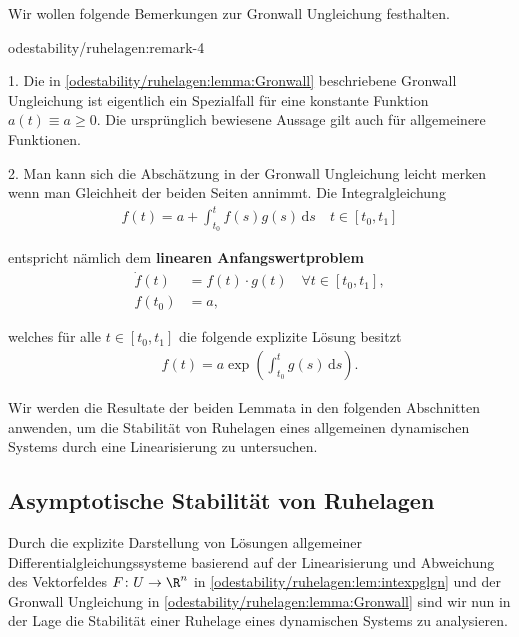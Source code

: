 \documentclass[letterpaper,10pt,english]{jupyterBook}
\begin{document}
\par
Wir wollen folgende Bemerkungen zur Gronwall Ungleichung festhalten.
\begin{remark}{}{odestability/ruhelagen:remark-4}



\par
1. Die in \cref{odestability/ruhelagen:lemma:Gronwall} beschriebene Gronwall Ungleichung ist eigentlich ein Spezialfall für eine konstante Funktion \(a(t) \equiv a \geq 0\).
Die ursprünglich bewiesene Aussage gilt auch für allgemeinere Funktionen.

\par
2. Man kann sich die Abschätzung in der Gronwall Ungleichung leicht merken wenn man Gleichheit der beiden Seiten annimmt.
Die Integralgleichung
\begin{align*}
f(t) = a + \int_{t_0}^t f(s)g(s)\, \mathrm{d}s \quad t\in [t_0,t_1]
\end{align*}
\par
entspricht nämlich dem \textbf{linearen Anfangswertproblem}
\begin{align*}
\dot{f}(t) &= f(t)\cdot g(t) \quad \forall t \in [t_0, t_1], \\
f(t_0) &= a,
\end{align*}
\par
welches für alle \(t \in [t_0, t_1]\) die folgende explizite Lösung besitzt
\begin{align*}
f(t) = a \exp{\left( \int_{t_0}^t g(s)\, \mathrm{d}s \right)}.
\end{align*}\end{remark}

\par
Wir werden die Resultate der beiden Lemmata in den folgenden Abschnitten anwenden, um die Stabilität von Ruhelagen eines allgemeinen dynamischen Systems durch eine Linearisierung zu untersuchen.


\subsection{Asymptotische Stabilität von Ruhelagen}
\label{\detokenize{odestability/ruhelagen:asymptotische-stabilitat-von-ruhelagen}}
\par
Durch die explizite Darstellung von Lösungen allgemeiner Differentialgleichungssysteme basierend auf der Linearisierung und Abweichung des Vektorfeldes \(F \colon U \rightarrow \R^n\) in \cref{odestability/ruhelagen:lem:intexpglgn} und der Gronwall Ungleichung in \cref{odestability/ruhelagen:lemma:Gronwall} sind wir nun in der Lage die Stabilität einer Ruhelage eines dynamischen Systems zu analysieren.
\end{document}
